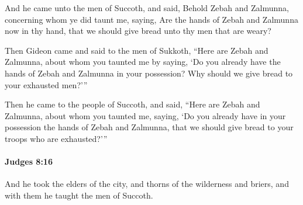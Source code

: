 			\begin{versebox}
					\item[BHS] 
					\item[ASV] And he came unto the men of Succoth, and said, Behold Zebah and Zalmunna, concerning whom ye did taunt me, saying, Are the hands of Zebah and Zalmunna now in thy hand, that we should give bread unto thy men that are weary?
					\item[NIV] Then Gideon came and said to the men of Sukkoth, “Here are Zebah and Zalmunna, about whom you taunted me by saying, ‘Do you already have the hands of Zebah and Zalmunna in your possession? Why should we give bread to your exhausted men?’”
					\item[NRSV] Then he came to the people of Succoth, and said, “Here are Zebah and Zalmunna, about whom you taunted me, saying, ‘Do you already have in your possession the hands of Zebah and Zalmunna, that we should give bread to your troops who are exhausted?’”
			\end{versebox}

		\paragraph{Judges 8:16} %
			\label{JUDGES-8-16}

			And he took the elders of the city, and thorns of the wilderness and briers, and with them he taught the men of Succoth.

